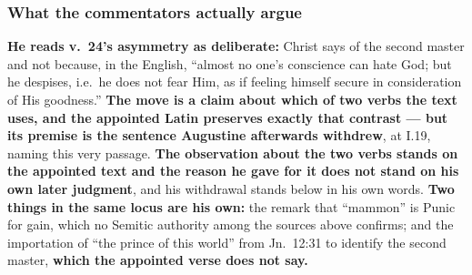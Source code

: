 \subsubsection*{What the commentators actually argue}

\begin{witnessnote}
 \textbf{He reads v.~24's asymmetry as deliberate:}
Christ says of the second master  and not 
because, in the  English, ``almost no one's
conscience can hate God; but he despises, i.e.\ he
does not fear Him, as if feeling himself secure in consideration of His
goodness.'' \textbf{The move is a claim about which of two verbs the text uses,
and the appointed Latin preserves exactly that contrast --- but its premise is
the sentence Augustine afterwards withdrew}, at  I.19,
naming this very passage. \textbf{The observation about the two verbs stands on
the appointed text and the reason he gave for it does not stand on his own
later judgment}, and his withdrawal stands below in his own words. \textbf{Two things in the same
locus are his own:} the remark that
``mammon'' is Punic for gain, which no Semitic authority among the sources
above confirms;
and the importation of ``the prince of this world'' from Jn.\ 12:31 to identify
the second master, \textbf{which the appointed verse does not say.}
\end{witnessnote}

